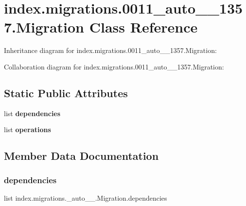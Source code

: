 \hypertarget{classindex_1_1migrations_1_10011__auto__20171024__1357_1_1Migration}{}\section{index.\+migrations.0011\+\_\+auto\+\_\+\_\+1357.Migration Class Reference}
\label{classindex_1_1migrations_1_10011__auto__20171024__1357_1_1Migration}


Inheritance diagram for index.\+migrations.0011\+\_\+auto\+\_\+\_\+1357.Migration\+:


Collaboration diagram for index.\+migrations.0011\+\_\+auto\+\_\+\_\+1357.Migration\+:
\subsection*{Static Public Attributes}
\begin{DoxyCompactItemize}
\item 
list {\bfseries dependencies}
\item 
\mbox{\label{classindex_1_1migrations_1_10011__auto__20171024__1357_1_1Migration_a34e874f147c7bbcb577c769a0bb247ba}} 
list {\bfseries operations}
\end{DoxyCompactItemize}


\subsection{Member Data Documentation}
\mbox{\label{classindex_1_1migrations_1_10011__auto__20171024__1357_1_1Migration_af376497d836817c10ec3b8e4b200f5f1}} 
\subsubsection{\texorpdfstring{dependencies}{dependencies}}
{\footnotesize\ttfamily list index.\+migrations.\+\_\+auto\+\_\+\_.\+Migration.\+dependencies\hspace{0.3cm}{\ttfamily [static]}}

